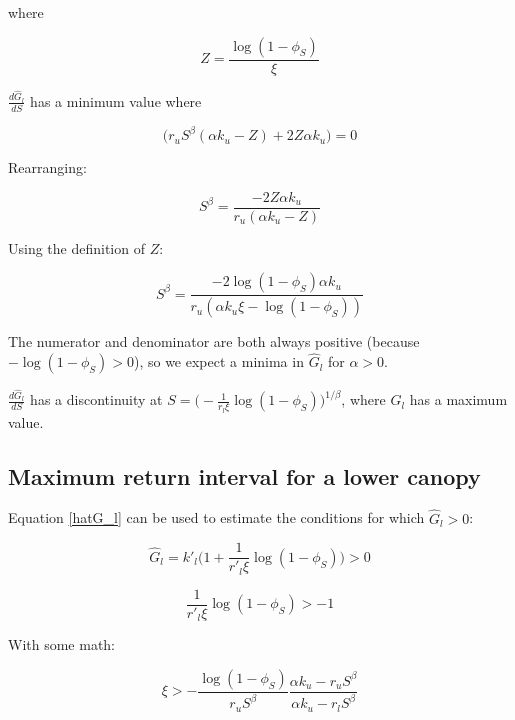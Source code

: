\documentclass[12pt]{article}
\begin{document}
where

\begin{equation}
Z = \frac{\log({1-\phi_S})}{\xi}
\end{equation}

 $\frac{d \hat{G}_l}{dS}$  has a minimum value where 
  
  \begin{equation}
  \big( {r_u} S^{\beta }(\alpha  {k_u}  - Z) +2 Z \alpha  {k_u} 
   \big) = 0
\end{equation}

Rearranging:

  \begin{equation}
 S^{\beta } = \frac{-2 Z \alpha  {k_u} }{{r_u}(\alpha  {k_u}  - Z)  }
\end{equation}

Using the definition of $Z$:

  \begin{equation}
 S^{\beta } = \frac{-2 {\log({1-\phi_S})} \alpha  {k_u} }{{r_u}(\alpha  {k_u} \xi - {\log({1-\phi_S})})  }
\end{equation}

The numerator and denominator are both always positive (because $- \log(1-\phi_S) > 0$), so we expect a minima in $\hat G_l$ for $\alpha > 0$.

 $\frac{d \hat{G}_l}{dS}$ has a discontinuity at  $ S = \big( - \frac{1}{r_l \xi }\log (1 - \phi_S)\big)^{1/\beta}$, where $G_l$ has a maximum value.   
%


\subsection*{Maximum return interval for a lower canopy}

Equation \ref{hatG_l} can be used to estimate the conditions for which $\hat G_l >0$:

\begin{equation}
\hat{G}_l =
 		k'_l \big( 1 + \frac{1}{r'_l \xi} \log(1-\phi_S) \big) > 0
\end{equation}


\begin{equation}
 		\frac{1}{r'_l \xi} \log(1-\phi_S) > -1
\end{equation}

With some math:

\begin{equation}
 	\xi > - \frac{\log(1-\phi_S)}{r_u S^\beta} \frac{\alpha k_u - r_u S^\beta}{\alpha k_u - r_l S^\beta}
\end{equation} 
\end{document}
